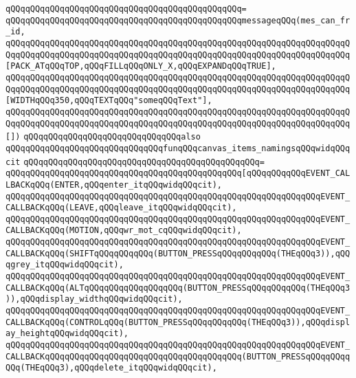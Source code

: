 \verb|qQQqqQQqqQQqqQQqqQQqqQQqqQQqqQQqqQQqqQQqqQQqqQQq=|\newline
\verb|qQQqqQQqqQQqqQQqqQQqqQQqqQQqqQQqqQQqqQQqqQQqqQQqmessageqQQq(mes_can_fr_id,|\newline
\verb|qQQqqQQqqQQqqQQqqQQqqQQqqQQqqQQqqQQqqQQqqQQqqQQqqQQqqQQqqQQqqQQqqQQqqQQqqQQqqQQqqQQqqQQqqQQqqQQqqQQqqQQqqQQqqQQqqQQqqQQqqQQqqQQqqQQqqQQqqQQq[PACK_ATqQQqTOP,qQQqFILLqQQqONLY_X,qQQqEXPANDqQQqTRUE],|\newline
\verb|qQQqqQQqqQQqqQQqqQQqqQQqqQQqqQQqqQQqqQQqqQQqqQQqqQQqqQQqqQQqqQQqqQQqqQQqqQQqqQQqqQQqqQQqqQQqqQQqqQQqqQQqqQQqqQQqqQQqqQQqqQQqqQQqqQQqqQQqqQQq[WIDTHqQQq350,qQQqTEXTqQQq"someqQQqText"],|\newline
\verb|qQQqqQQqqQQqqQQqqQQqqQQqqQQqqQQqqQQqqQQqqQQqqQQqqQQqqQQqqQQqqQQqqQQqqQQqqQQqqQQqqQQqqQQqqQQqqQQqqQQqqQQqqQQqqQQqqQQqqQQqqQQqqQQqqQQqqQQqqQQq[])|\newline
\newline
\verb|qQQqqQQqqQQqqQQqqQQqqQQqqQQqqQQqalso|\newline
\verb|qQQqqQQqqQQqqQQqqQQqqQQqqQQqqQQqfunqQQqcanvas_items_namingsqQQqwidqQQqcit|\newline
\verb|qQQqqQQqqQQqqQQqqQQqqQQqqQQqqQQqqQQqqQQqqQQqqQQq=|\newline
\verb|qQQqqQQqqQQqqQQqqQQqqQQqqQQqqQQqqQQqqQQqqQQqqQQq[qQQqqQQqqQQqEVENT_CALLBACKqQQq(ENTER,qQQqenter_itqQQqwidqQQqcit),|\newline
\verb|qQQqqQQqqQQqqQQqqQQqqQQqqQQqqQQqqQQqqQQqqQQqqQQqqQQqqQQqqQQqqQQqEVENT_CALLBACKqQQq(LEAVE,qQQqleave_itqQQqwidqQQqcit),|\newline
\verb|qQQqqQQqqQQqqQQqqQQqqQQqqQQqqQQqqQQqqQQqqQQqqQQqqQQqqQQqqQQqqQQqEVENT_CALLBACKqQQq(MOTION,qQQqwr_mot_cqQQqwidqQQqcit),|\newline
\verb|qQQqqQQqqQQqqQQqqQQqqQQqqQQqqQQqqQQqqQQqqQQqqQQqqQQqqQQqqQQqqQQqEVENT_CALLBACKqQQq(SHIFTqQQqqQQqqQQq(BUTTON_PRESSqQQqqQQqqQQq(THEqQQq3)),qQQqgrey_itqQQqwidqQQqcit),|\newline
\verb|qQQqqQQqqQQqqQQqqQQqqQQqqQQqqQQqqQQqqQQqqQQqqQQqqQQqqQQqqQQqqQQqEVENT_CALLBACKqQQq(ALTqQQqqQQqqQQqqQQqqQQq(BUTTON_PRESSqQQqqQQqqQQq(THEqQQq3)),qQQqdisplay_widthqQQqwidqQQqcit),|\newline
\verb|qQQqqQQqqQQqqQQqqQQqqQQqqQQqqQQqqQQqqQQqqQQqqQQqqQQqqQQqqQQqqQQqEVENT_CALLBACKqQQq(CONTROLqQQq(BUTTON_PRESSqQQqqQQqqQQq(THEqQQq3)),qQQqdisplay_heightqQQqwidqQQqcit),|\newline
\verb|qQQqqQQqqQQqqQQqqQQqqQQqqQQqqQQqqQQqqQQqqQQqqQQqqQQqqQQqqQQqqQQqEVENT_CALLBACKqQQqqQQqqQQqqQQqqQQqqQQqqQQqqQQqqQQqqQQq(BUTTON_PRESSqQQqqQQqqQQq(THEqQQq3),qQQqdelete_itqQQqwidqQQqcit),|\newline
